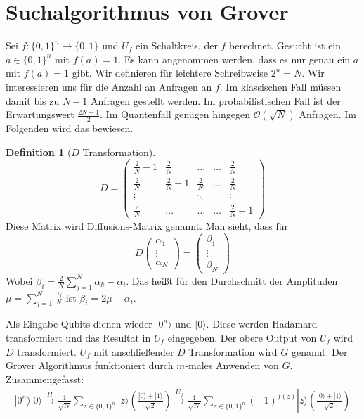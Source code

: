 \documentclass[a4paper, 12pt]{article}
\theoremstyle{plain}
\theoremstyle{definition}
\newtheorem{definition}[theorem]{Definition} %
\theoremstyle{lemma}
\theoremstyle{remark}
\theoremstyle{example}
\begin{document}
	\section{Suchalgorithmus von Grover}
	Sei $f:\{0,1\}^n \to \{0,1\}$ und $U_f$ ein Schaltkreis, der $f$ berechnet. Gesucht ist ein $a \in \{0,1\}^n$ mit $f(a) = 1$. Es kann angenommen werden, dass es nur genau ein $a$ mit $f(a) = 1$ gibt. Wir definieren für leichtere Schreibweise $2^n = N$. Wir interessieren uns für die Anzahl an Anfragen an $f$. Im klassischen Fall müssen damit bis zu $N-1$ Anfragen gestellt werden. Im probabilistischen Fall ist der Erwartungswert $\frac{2N-1}{2}$. Im Quantenfall genügen hingegen $\mathcal{O}(\sqrt{N})$ Anfragen. Im Folgenden wird das bewiesen.\\
	\begin{definition}[$D$ Transformation]
		\[D = \begin{pmatrix}
			\frac{2}{N} - 1 & \frac{2}{N} & \dots & \dots & \frac{2}{N}\\
			\frac{2}{N} & \frac{2}{N} - 1 & \frac{2}{N} & \dots & \frac{2}{N}\\
			\vdots & & \ddots & & \vdots\\
			\frac{2}{N} & \dots & \dots & \dots & \frac{2}{N} -1
		\end{pmatrix}\]
		Diese Matrix wird Diffusions-Matrix genannt. Man sieht, dass für \[D \begin{pmatrix}
			\alpha_1\\
			\vdots\\
			\alpha_N
		\end{pmatrix} = \begin{pmatrix}
		\beta_1\\
		\vdots\\
		\beta_N
	\end{pmatrix}\]
	Wobei $\beta_i = \frac{2}{N}\sum_{j=1}^N \alpha_k - \alpha_i$. Das heißt für den Durchschnitt der Amplituden $\mu = \sum_{j=1}^N \frac{\alpha_j}{N}$ ist $\beta_i = 2\mu - \alpha_i$.
	\end{definition}
	Als Eingabe Qubits dienen wieder $|0^n\rangle$ und $|0\rangle$. Diese werden Hadamard transformiert und das Resultat in $U_f$ eingegeben. Der obere Output von $U_f$ wird $D$ transformiert. $U_f$ mit anschließender $D$ Transformation wird $G$ genannt. Der Grover Algorithmus funktioniert durch $m$-males Anwenden von $G$. Zusammengefasst:
	\begin{eqnarray*}
		|0^n\rangle |0\rangle \overset{H}{\to} \frac{1}{\sqrt{N}} \sum_{z \in \{0,1\}^n} |z\rangle \left(\frac{|0\rangle +|1\rangle}{\sqrt{2}}\right) \overset{U_f}{\to} \frac{1}{\sqrt{N}} \sum_{z \in \{0,1\}^n} (-1)^{f(z)}|z\rangle \left(\frac{|0\rangle +|1\rangle}{\sqrt{2}}\right)
	\end{eqnarray*}
\end{document}

